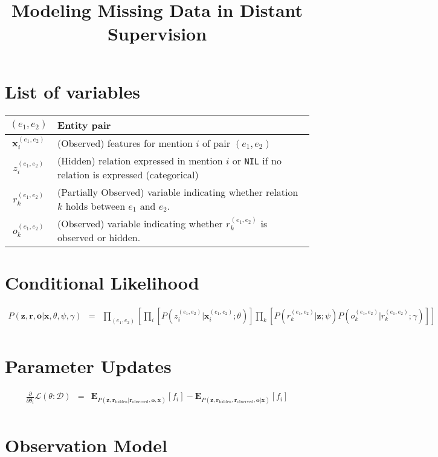 \documentclass[12pt]{article}
\begin{document}
\date{}
\title{Modeling Missing Data in Distant Supervision}
\author{}
\maketitle



\section{List of variables}

\begin{center}
\begin{tabular}{|c|p{4in}|}
\hline
$(e_1,e_2)$ & Entity pair \\
\hline
$\mathbf{x}^{(e_1,e_2)}_i$ & (Observed) features for mention $i$ of pair $(e_1,e_2)$ \\
\hline
$z^{(e_1,e_2)}_i$ & (Hidden) relation expressed in mention $i$ or {\tt NIL} if no relation is expressed (categorical) \\
\hline
$r^{(e_1,e_2)}_k$ & (Partially Observed) variable indicating whether relation $k$ holds between $e_1$ and $e_2$. \\
\hline
$o^{(e_1,e_2)}_k$ & (Observed) variable indicating whether $r^{(e_1,e_2)}_k$ is observed or hidden. \\
\hline
\end{tabular}
\end{center}

\section{Conditional Likelihood}
\begin{eqnarray*}
  P(\mathbf{z}, \mathbf{r}, \mathbf{o}|\mathbf{x},\theta,\psi,\gamma) & = & \prod_{(e_1,e_2)} \left[ \prod_i \left[ P(z^{(e_1,e_2)}_i|\mathbf{x}^{(e_1,e_2)}_i;\theta) \right] \prod_{k} \left[P(r^{(e_1,e_2)}_k|\mathbf{z};\psi) P(o^{(e_1,e_2)}_k|r^{(e_1,e_2)}_k;\gamma) \right] \right]\\
\end{eqnarray*}

\section{Parameter Updates}

\begin{eqnarray*}
  \frac{\partial}{\partial \theta_i} \mathcal{L}(\theta:\mathcal{D}) & = & \mathbf{E}_{P(\mathbf{z},\mathbf{r}_{\text{hidden}}|\mathbf{r}_{\text{observed}}, \mathbf{o}, \mathbf{x})}[f_i] - \mathbf{E}_{P(\mathbf{z},\mathbf{r}_{\text{hidden}}, \mathbf{r}_{\text{observed}}, \mathbf{o} | \mathbf{x})}[f_i] \\
\end{eqnarray*}

\section{Observation Model}


\end{document}
